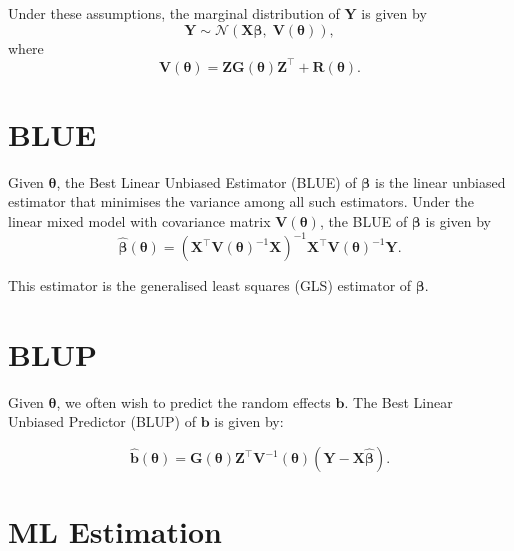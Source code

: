 \documentclass[
  letterpaper,
  DIV=11,
  numbers=noendperiod]{scrartcl}
\begin{document}
Under these assumptions, the marginal distribution of \(\symbf{Y}\) is
given by \begin{equation}
\symbf{Y} \sim \mathcal{N}\left(\symbf{X}\symbf{\beta},\; \symbf{V}(\symbf{\theta})\right),
\end{equation} where \begin{equation}
\label{eq-sigma}
\symbf{V}(\symbf{\theta}) = \symbf{Z}\symbf{G}(\symbf{\theta})\symbf{Z}^\top + \symbf{R}(\symbf{\theta}).
\end{equation}

\section{BLUE}\label{blue}

Given \(\symbf{\theta}\), the Best Linear Unbiased Estimator (BLUE) of
\(\symbf{\beta}\) is the linear unbiased estimator that minimises the
variance among all such estimators. Under the linear mixed model with
covariance matrix \(\symbf{V}(\symbf{\theta})\), the BLUE of
\(\symbf{\beta}\) is given by \begin{equation}
\widehat{\symbf{\beta}}(\symbf{\theta})
=
\left(\symbf{X}^\top \symbf{V}(\symbf{\theta})^{-1} \symbf{X}\right)^{-1}
\symbf{X}^\top \symbf{V}(\symbf{\theta})^{-1} \symbf{Y}.
\end{equation}

This estimator is the generalised least squares (GLS) estimator of
\(\symbf{\beta}\).

\section{BLUP}\label{blup}

Given \(\symbf{\theta}\), we often wish to predict the random effects
\(\symbf{b}\). The Best Linear Unbiased Predictor (BLUP) of
\(\symbf{b}\) is given by:

\begin{equation}
\widehat{\symbf{b}}(\symbf{\theta}) = \symbf{G}(\symbf{\theta})\symbf{Z}^\top \symbf{V}^{-1}(\symbf{\theta}) (\symbf{Y} - \symbf{X}\widehat{\symbf{\beta}}).
\label{eq:blup}
\end{equation}

\section{ML Estimation}\label{ml-estimation}
\end{document}
